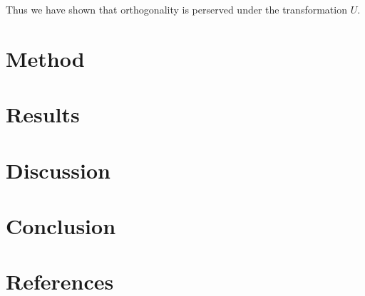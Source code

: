\documentclass[english,a4paper, 11pt]{article}
\begin{document}
Thus we have shown that orthogonality is perserved under the transformation $U$.



\section{Method}


\section{Results}


\section{Discussion}




\section{Conclusion}



\section{References}
 
\end{document}
